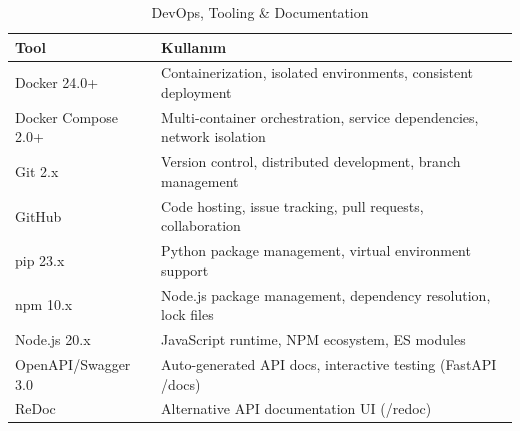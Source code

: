 \documentclass[a4paper,12pt]{report}
\begin{document}
\begin{table}[h]
\centering
\small
\begin{tabular}{|l|p{10.5cm}|}
\hline
\textbf{Tool} & \textbf{Kullanım} \\ \hline
Docker 24.0+ & Containerization, isolated environments, consistent deployment \\ \hline
Docker Compose 2.0+ & Multi-container orchestration, service dependencies, network isolation \\ \hline
Git 2.x & Version control, distributed development, branch management \\ \hline
GitHub & Code hosting, issue tracking, pull requests, collaboration \\ \hline
pip 23.x & Python package management, virtual environment support \\ \hline
npm 10.x & Node.js package management, dependency resolution, lock files \\ \hline
Node.js 20.x & JavaScript runtime, NPM ecosystem, ES modules \\ \hline
OpenAPI/Swagger 3.0 & Auto-generated API docs, interactive testing (FastAPI /docs) \\ \hline
ReDoc & Alternative API documentation UI (/redoc) \\ \hline
\end{tabular}
\caption{DevOps, Tooling \& Documentation}
\end{table}

\vspace{0.2cm}
\end{document}
